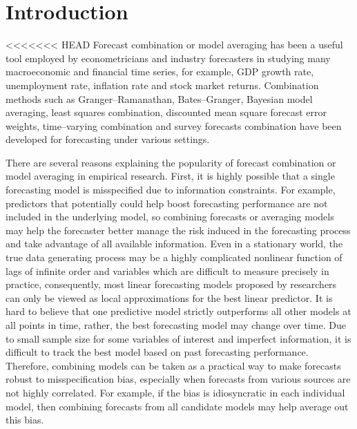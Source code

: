 \section{Introduction}
<<<<<<< HEAD
Forecast combination or model averaging has been a useful tool employed by econometricians and industry forecasters in studying many macroeconomic and financial time series, for example, GDP growth rate, unemployment rate, inflation rate and stock market returns. Combination methods such as Granger--Ramanathan, Bates--Granger, Bayesian model averaging, least squares combination, discounted mean square forecast error weights, time--varying combination and survey forecasts combination have been developed for forecasting under various settings.

There are several reasons explaining the popularity of forecast combination or model averaging in empirical research. First, it is highly possible that a single forecasting model is misspecified due to information constraints. For example, predictors that potentially could help boost forecasting performance are not included in the underlying model, so combining forecasts or averaging models may help the forecaster better manage the risk induced in the forecasting process and take advantage of all available information. Even in a stationary world, the true data generating process may be a highly complicated nonlinear function of lags of infinite order and variables which are difficult to measure precisely in practice, consequently, most linear forecasting models proposed by researchers can only be viewed as local approximations for the best linear predictor. It is hard to believe that one predictive model strictly outperforms all other models at all points in time, rather, the best forecasting model may change over time. Due to small sample size for some variables of interest and imperfect information, it is difficult to track the best model based on past forecasting performance. Therefore, combining models can be taken as a practical way to make forecasts robust to misspecification bias, especially when forecasts from various sources are not highly correlated. For example, if the bias is idiosyncratic in each individual model, then combining forecasts from all candidate models may help average out this bias.

